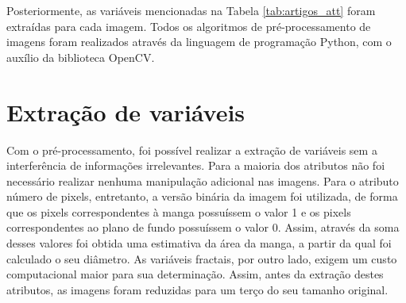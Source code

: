 \begin{figure}[!htb]
\end{figure}

Posteriormente, as variáveis mencionadas na Tabela \ref{tab:artigos_att} foram extraídas para cada imagem. Todos os algoritmos de pré-processamento de imagens foram realizados através da linguagem de programação Python, com o auxílio da biblioteca OpenCV.

\section{Extração de variáveis}

Com o pré-processamento, foi possível realizar a extração de variáveis sem a interferência de informações irrelevantes. Para a maioria dos atributos não foi necessário realizar nenhuma manipulação adicional nas imagens. Para o atributo número de pixels, entretanto, a versão binária da imagem foi utilizada, de forma que os pixels correspondentes à manga possuíssem o valor 1 e os pixels correspondentes ao plano de fundo possuíssem o valor 0. Assim, através da soma desses valores foi obtida uma estimativa da área da manga, a partir da qual foi calculado o seu diâmetro. As variáveis fractais, por outro lado, exigem um custo computacional maior para sua determinação. Assim, antes da extração destes atributos, as imagens foram reduzidas para um terço do seu tamanho original.

